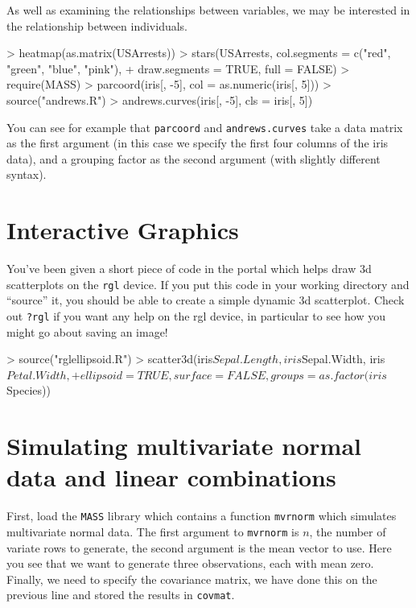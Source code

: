 As well as examining the relationships between variables, we may be interested in the relationship between individuals.

\begin{Schunk}
\begin{Sinput}
> heatmap(as.matrix(USArrests))
> stars(USArrests, col.segments = c("red", "green", "blue", "pink"), 
+     draw.segments = TRUE, full = FALSE)
> require(MASS)
> parcoord(iris[, -5], col = as.numeric(iris[, 5]))
> source("andrews.R")
> andrews.curves(iris[, -5], cls = iris[, 5])
\end{Sinput}
\end{Schunk}

You can see for example that \texttt{parcoord} and \texttt{andrews.curves} take a data matrix as the first argument (in this case we specify the first four columns of the iris data), and a grouping factor as the second argument (with slightly different syntax).


\section{Interactive Graphics}

You've been given a short piece of code in the portal which helps draw 3d scatterplots on the \texttt{rgl} device.   If you put this code in your working directory and ``source'' it, you should be able to create a simple dynamic 3d scatterplot.   Check out \texttt{?rgl} if you want any help on the rgl device, in particular to see how you might go about saving an image!

\begin{Schunk}
\begin{Sinput}
> source("rglellipsoid.R")
> scatter3d(iris$Sepal.Length, iris$Sepal.Width, iris$Petal.Width, 
+     ellipsoid = TRUE, surface = FALSE, groups = as.factor(iris$Species))
\end{Sinput}
\end{Schunk}


\section{Simulating multivariate normal data and linear combinations}

First, load the \texttt{MASS} library which contains a function \texttt{mvrnorm} which simulates multivariate normal data.   The first argument to \texttt{mvrnorm} is $n$, the number of variate rows to generate, the second argument is the mean vector to use.   Here you see that we want to generate three observations, each with mean zero.   Finally, we need to specify the covariance matrix, we have done this on the previous line and stored the results in \texttt{covmat}.


